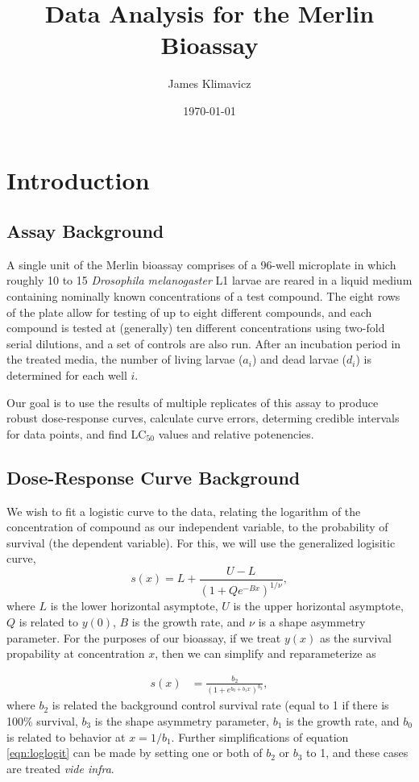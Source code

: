 \documentclass[11pt, letterpaper]{article}
\numberwithin{equation}{section}
\begin{document}
\title{Data Analysis for the Merlin Bioassay}
\date{\today}
\author{James Klimavicz}
\maketitle

\section{Introduction}
\subsection{Assay Background}
A single unit of the Merlin bioassay comprises of a 96-well microplate in which roughly 10 to 15 \textit{Drosophila melanogaster} L1 larvae are reared in a liquid medium containing nominally known concentrations of a test compound. The eight rows of the plate allow for testing of up to eight different compounds, and each compound is tested at (generally) ten different concentrations using two-fold serial dilutions, and a set of controls are also run. After an incubation period in the treated media, the number of living larvae ($a_i$) and dead larvae ($d_i$) is determined for each well $i$.

Our goal is to use the results of multiple replicates of this assay to produce robust dose-response curves, calculate curve errors, determing credible intervals for data points, and find LC$_{50}$ values and relative potenencies. 

\subsection{Dose-Response Curve Background}
We wish to fit a logistic curve to the data, relating the logarithm of the concentration of compound as our independent variable, to the probability of survival (the dependent variable). For this, we will use the generalized logisitic curve, $$s(x) = L + \frac{U - L}{\left(1 + Q e^{-Bx}\right)^{1/\nu}},$$ where $L$ is the lower horizontal asymptote, $U$ is the upper horizontal asymptote, $Q$ is related to $y(0)$, $B$ is the growth rate, and $\nu$ is a shape asymmetry parameter. For the purposes of our bioassay, if we treat $y(x)$ as the survival propability at concentration $x$, then we can simplify and reparameterize as

\begin{align}
s(x) &= \frac{b_2}{\left(1+e^{b_0 + b_1x}\right)^{b_3}}, \label{eqn:loglogit}
\end{align}
where $b_2$ is related the background control survival rate (equal to 1 if there is 100\% survival, $b_3$ is the shape asymmetry parameter, $b_1$ is the growth rate, and $b_0$ is related to behavior at $x=1/b_1$. Further simplifications of equation \ref{eqn:loglogit} can be made by setting one or both of $b_2$ or $b_3$ to 1, and these cases are treated \textit{vide infra}.
\end{document}
